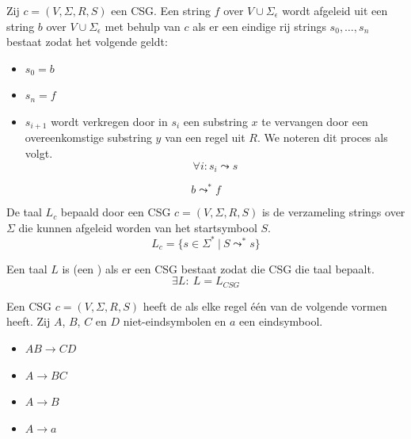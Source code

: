 \documentclass[main.tex]{subfiles}
\begin{document}
\begin{de}
  Zij $c = (V,\Sigma,R,S)$ een CSG.
  Een string $f$ over $V \cup \Sigma_{\epsilon}$ wordt afgeleid uit een string $b$ over $V \cup \Sigma_{\epsilon}$ met behulp van $c$ als er een eindige rij strings $s_{0},\dotsc,s_{n}$ bestaat zodat het volgende geldt:
  \begin{itemize}
  \item $s_{0} = b$
  \item $s_{n} = f$
  \item $s_{i+1}$ wordt verkregen door in $s_{i}$ een substring $x$ te vervangen door een overeenkomstige substring $y$ van een regel uit $R$.
    We noteren dit proces als volgt.
    \[ \forall i: s_{i} \leadsto s \]
  \end{itemize}
  \[ b \leadsto^{*} f \]
\end{de}

\begin{de}
  De taal $L_{c}$ bepaald door een CSG $c = (V,\Sigma,R,S)$ is de verzameling strings over $\Sigma$ die kunnen afgeleid worden van het startsymbool $S$.
  \[ L_{c} = \{ s \in \Sigma^{*}\ |\ S \leadsto^{*} s \}
\]
\end{de}

\begin{de}
  Een taal $L$ is  (een ) als er een CSG bestaat zodat die CSG die taal bepaalt.
  \[ \exists L:\ L = L_{CSG} \]
\end{de}

\begin{de}
  Een CSG $c = (V,\Sigma,R,S)$ heeft de  als elke regel \'e\'en van de volgende vormen heeft.
  Zij $A$, $B$, $C$ en $D$ niet-eindsymbolen en $a$ een eindsymbool.
  \begin{itemize}
  \item $AB \rightarrow CD$
  \item $A \rightarrow BC$
  \item $A \rightarrow B$
  \item $A \rightarrow a$
  \end{itemize}
\end{de}

\end{document}
